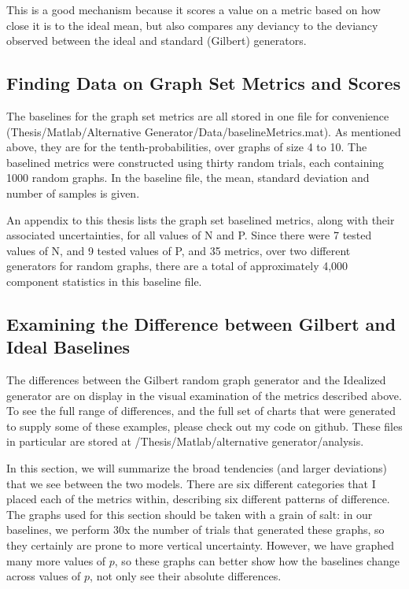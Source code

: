 This is a good mechanism because it scores a value on a metric based on how close it is to the ideal mean, but also compares any deviancy to the deviancy observed between the ideal and standard (Gilbert) generators.

\subsection{Finding Data on Graph Set Metrics and Scores}

The baselines for the graph set metrics are all stored in one file for convenience (Thesis/Matlab/Alternative Generator/Data/baselineMetrics.mat).
As mentioned above, they are for the tenth-probabilities, over graphs of size 4 to 10.
The baselined metrics were constructed using thirty random trials, each containing 1000 random graphs.
In the baseline file, the mean, standard deviation and number of samples is given.

An appendix to this thesis lists the graph set baselined metrics, along with their associated uncertainties, for all values of N and P.
Since there were 7 tested values of N, and 9 tested values of P, and 35 metrics, over two different generators for random graphs, there are a total of approximately 4,000 component statistics in this baseline file.

\subsection{Examining the Difference between Gilbert and Ideal Baselines}

The differences between the Gilbert random graph generator and the Idealized generator are on display in the visual examination of the metrics described above.
To see the full range of differences, and the full set of charts that were generated to supply some of these examples, please check out my code on github.
These files in particular are stored at /Thesis/Matlab/alternative generator/analysis.

In this section, we will summarize the broad tendencies (and larger deviations) that we see between the two models.
There are six different categories that I placed each of the metrics within, describing six different patterns of difference.
The graphs used for this section should be taken with a grain of salt: in our baselines, we perform 30x the number of trials that generated these graphs, so they certainly are prone to more vertical uncertainty.
However, we have graphed many more values of $p$, so these graphs can better show how the baselines change across values of $p$, not only see their absolute differences.

